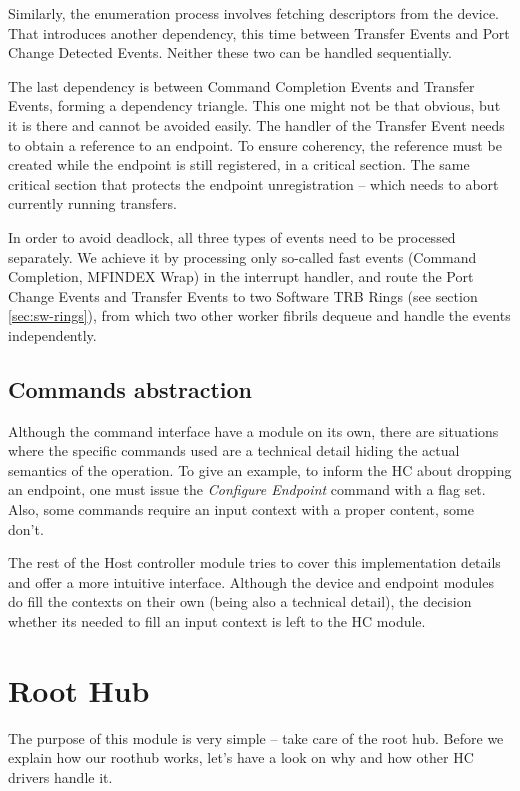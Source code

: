 Similarly, the enumeration process involves fetching descriptors from the
device. That introduces another dependency, this time between Transfer
Events and Port Change Detected Events. Neither these two can be handled
sequentially.

The last dependency is between Command Completion Events and Transfer Events,
forming a dependency triangle. This one might not be that obvious, but it is
there and cannot be avoided easily. The handler of the Transfer Event needs to
obtain a reference to an endpoint. To ensure coherency, the reference must be
created while the endpoint is still registered, in a critical section. The same
critical section that protects the endpoint unregistration -- which needs to
abort currently running transfers.

In order to avoid deadlock, all three types of events need to be processed
separately. We achieve it by processing only so-called fast events (Command
Completion, MFINDEX Wrap) in the interrupt handler, and route the Port Change
Events and Transfer Events to two Software TRB Rings (see section \ref{sec:sw-rings}),
from which two other worker fibrils dequeue and handle the events independently.

\subsection{Commands abstraction}

Although the command interface have a module on its own, there are situations
where the specific commands used are a technical detail hiding the actual
semantics of the operation. To give an example, to inform the HC about dropping
an endpoint, one must issue the \emph{Configure Endpoint} command with a flag
set. Also, some commands require an input context with a proper content, some don't.

The rest of the Host controller module tries to cover this implementation
details and offer a more intuitive interface. Although the device and endpoint
modules do fill the contexts on their own (being also a technical detail), the
decision whether its needed to fill an input context is left to the HC module.

\section{Root Hub}

The purpose of this module is very simple -- take care of the root hub. Before
we explain how our roothub works, let's have a look on why and how other HC
drivers handle it.

